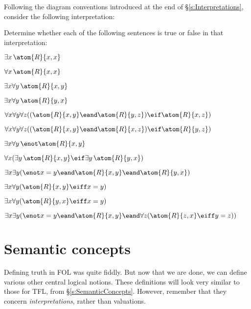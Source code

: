 \problempart
\label{pr.TorF3}
Following the diagram conventions introduced at the end of \S\ref{s:Interpretations}, consider the following interpretation:	
\begin{center}
\end{center}
Determine whether each of the following sentences is true or false in that interpretation:
\begin{earg}
\item $\exists x\, \atom{R}{x,x}$
\item $\forall x\, \atom{R}{x,x}$
\item $\exists x \forall y\, \atom{R}{x,y}$
\item $\exists x \forall y\, \atom{R}{y,x}$
\item $\forall x \forall y \forall z ((\atom{R}{x,y} \eand \atom{R}{y,z}) \eif \atom{R}{x,z})$
\item $\forall x \forall y \forall z ((\atom{R}{x,y} \eand \atom{R}{x,z}) \eif \atom{R}{y,z})$
\item $\exists x \forall y\, \enot \atom{R}{x,y}$
\item $\forall x(\exists y\, \atom{R}{x,y} \eif \exists y\, \atom{R}{y,x})$
\item $\exists x \exists y (\enot x = y \eand \atom{R}{x,y} \eand \atom{R}{y,x})$
\item $\exists x \forall y(\atom{R}{x,y} \eiff x = y)$
\item $\exists x \forall y(\atom{R}{y,x} \eiff x = y)$
\item $\exists x \exists y(\enot x = y \eand \atom{R}{x,y} \eand \forall z(\atom{R}{z,x} \eiff y = z))$
\end{earg}


\chapter{Semantic concepts}

Defining truth in FOL was quite fiddly. But now that we are done, we can define various other central logical notions. These definitions will look very similar to those for TFL, from \S\ref{s:SemanticConcepts}. However, remember that they concern \emph{interpretations}, rather than valuations.

